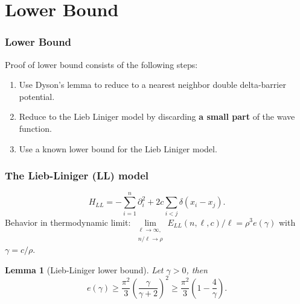 \documentclass{beamer}[10]
\newtheorem{mlemma}{Lemma}
\begin{document}
\section{Lower Bound}

\begin{frame}
	\frametitle{Lower Bound}
	Proof of lower bound consists of the following steps:
	\begin{enumerate}
		\item Use Dyson's lemma to reduce to a nearest neighbor double delta-barrier potential.
		\item Reduce to the Lieb Liniger model by discarding \textbf{a small part} of the wave function.
		\item Use a known lower bound for the Lieb Liniger model.
	\end{enumerate}	
\end{frame}

\begin{frame}
	\frametitle{The Lieb-Liniger (LL) model}
	\begin{block}{}
	\begin{equation}
	H_{LL}=-\sum_{i=1}^{n}\partial_i^2+2c\sum_{i<j}\delta(x_i-x_j).
	\end{equation}
	Behavior in thermodynamic limit: $ \lim\limits_{\substack{\ell\to\infty,\\ n/\ell\to \rho}}E_{LL}(n,\ell,c)/\ell=\rho^3 e(\gamma) $ with $ \gamma=c/\rho  $.
		\begin{mlemma}[Lieb-Liniger lower bound] \label{LemmaLL-LowerBound}
			Let $ \gamma>0 $, then
			\begin{equation}
			e(\gamma)\geq \frac{\pi^2}{3}\left(\frac{\gamma}{\gamma+2}\right)^2\geq \frac{\pi^2}{3}\left(1-\frac{4}{\gamma}\right).
			\end{equation}
		\end{mlemma}
	\end{block}	
\end{frame}
\end{document}
